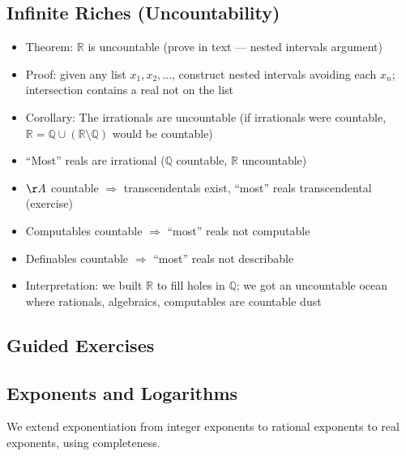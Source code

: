 \documentclass[
  10pt,
  letterpaper,
]{scrbook}
\providecommand{\tightlist}{%
  \setlength{\itemsep}{0pt}\setlength{\parskip}{0pt}}
\newcommand{\QQ}{\mathbb{Q}}
\newcommand{\RR}{\mathbb{R}}
\begin{document}
\subsection{Infinite Riches
(Uncountability)}\label{infinite-riches-uncountability}

\begin{itemize}
\tightlist
\item
  Theorem: \(\RR\) is uncountable (prove in text --- nested intervals
  argument)
\item
  Proof: given any list \(x_1, x_2, \ldots\), construct nested intervals
  avoiding each \(x_n\); intersection contains a real not on the list
\item
  Corollary: The irrationals are uncountable (if irrationals were
  countable, \(\RR = \QQ \cup (\RR \setminus \QQ)\) would be countable)
\item
  ``Most'' reals are irrational (\(\QQ\) countable, \(\RR\) uncountable)
\item
  \(\AA\) countable \(\Rightarrow\) transcendentals exist, ``most''
  reals transcendental (exercise)
\item
  Computables countable \(\Rightarrow\) ``most'' reals not computable
\item
  Definables countable \(\Rightarrow\) ``most'' reals not describable
\item
  Interpretation: we built \(\RR\) to fill holes in \(\QQ\); we got an
  uncountable ocean where rationals, algebraics, computables are
  countable dust
\end{itemize}

\subsection{Guided Exercises}\label{guided-exercises-1}

\subsection{Exponents and Logarithms}\label{exponents-and-logarithms}

We extend exponentiation from integer exponents to rational exponents to
real exponents, using completeness.
\end{document}
